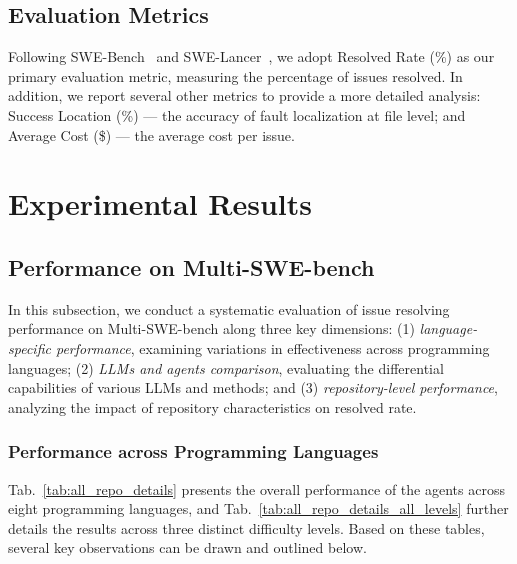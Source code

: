 \documentclass[11pt, a4paper, logo, copyright, nonumbering]{seed}
\newcommand{\multiswebench}{Multi-SWE-bench\xspace}
\begin{document}
\subsection{Evaluation Metrics}
Following SWE-Bench~\citep{swe-bench} and SWE-Lancer~\citep{swelancer}, we adopt Resolved Rate (\%) as our primary evaluation metric, measuring the percentage of issues resolved.
In addition, we report several other metrics to provide a more detailed analysis: 
Success Location (\%) — the accuracy of fault localization at file level; 
and Average Cost (\$) — the average cost per issue.


\section{Experimental Results}
\subsection{Performance on \multiswebench}

In this subsection, we conduct a systematic evaluation of issue resolving performance on \multiswebench along three key dimensions: 
(1) \emph{language-specific performance}, examining variations in effectiveness across programming languages; 
(2) \emph{LLMs and agents comparison}, evaluating the differential capabilities of various LLMs and methods; 
and (3) \emph{repository-level performance}, analyzing the impact of repository characteristics on resolved rate.

\subsubsection{Performance across Programming Languages}

Tab.~\ref{tab:all_repo_details} presents the overall performance of the agents across eight programming languages, and Tab.~\ref{tab:all_repo_details_all_levels} further details the results across three distinct difficulty levels.
Based on these tables, several key observations can be drawn and outlined below.
\end{document}

